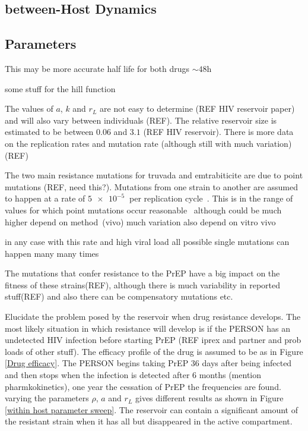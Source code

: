 \documentclass[DIV=15]{scrartcl}
\begin{document}
\subsection{between-Host Dynamics}  
  
  
  
  \iffalse
  
  
  
\subsection{Parameters}
\label{Parameters}


 This may be more accurate half life for both drugs $\sim 48$h~\cite{patterson2011}
 
 

some stuff for the hill function~\cite{shirreff2011}
~\cite{hollingsworth2008}



The values of $a$, $k$ and $r_L$ are not easy to determine (REF HIV reservoir paper)
and will also vary between individuals (REF). The relative reservoir size is estimated to be between $0.06$ and $3.1$ (REF HIV reservoir). There is more data on the replication rates and mutation rate (although still with much variation) (REF)

The two main resistance mutations for truvada and emtrabiticite are due to point mutations (REF, need this?). Mutations from one strain to another are assumed to happen at a rate of $\SI{5e-5}{}$ per replication cycle~\cite{gao2004}. This is in the range of values for which point mutations occur reasonable~\cite{abram2010}
although could be much higher depend on method~\cite{cuevas2015}(vivo) much variation also depend on vitro vivo

in any case with this rate  and high viral load all possible single mutations can happen many many times~\cite{coffin1995}

The mutations that confer resistance to the PrEP have a big impact on the fitness of these strains(REF), although there is much variability in reported stuff(REF) and also there can be compensatory mutations etc.


Elucidate the problem posed by the reservoir when drug resistance develops. The  most likely situation in which resistance will develop is  if  the PERSON has an undetected HIV infection before starting PrEP (REF iprex and partner and prob loads of  other stuff). The efficacy profile of the drug is assumed to be as in Figure \ref{Drug efficacy}. The PERSON begins taking PrEP $36$ days after being infected and then stops when the infection is detected after $6$ months (mention pharmkokinetics), one year the cessation  of PrEP the frequencies are found. varying the parameters $\rho$, $a$ and $r_L$ 
gives different results as shown in Figure \ref{within host parameter sweep}. The reservoir can contain a significant amount of the resistant strain when it has all   but disappeared in the active compartment.
\end{document}
